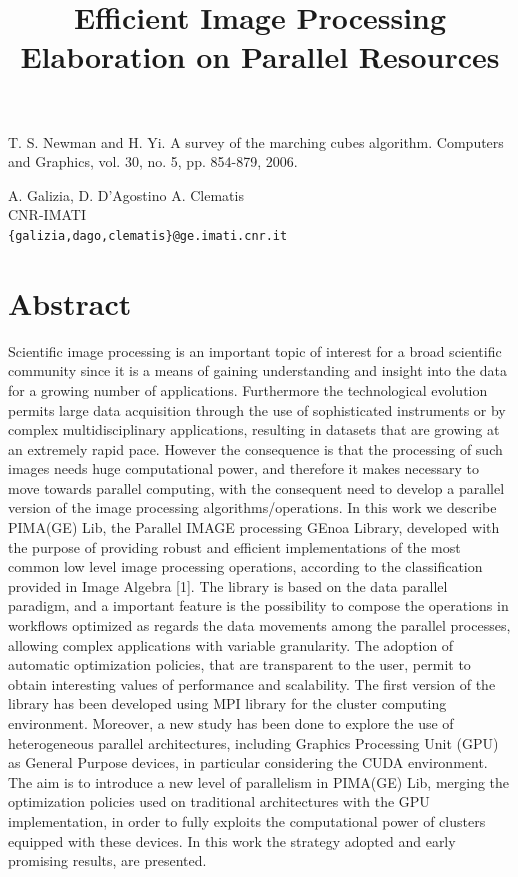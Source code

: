 \documentclass[article,A4,11pt]{llncs}%
\begin{document}

\begin{thebibliography}{10}
{\sc T. S. Newman and H. Yi}. {A survey of the marching cubes algorithm}. Computers and Graphics, vol. 30, no. 5, pp. 854-879, 2006.
\end{thebibliography}

\title{Efficient Image Processing Elaboration on Parallel Resources}
 \author{} \institute{}
\maketitle
\begin{center}
{\large A. Galizia, D. D'Agostino A. Clematis}\\
CNR-IMATI\\
{\tt \{galizia,dago,clematis\}@ge.imati.cnr.it}
\end{center}

\section*{Abstract}
Scientific image processing is an important topic of interest for a broad scientific community since it is a means of gaining understanding and insight into the data for a growing number of applications. Furthermore the technological evolution permits large data acquisition through the use of sophisticated instruments or by complex multidisciplinary applications, resulting in datasets that are growing at an extremely rapid pace. However the consequence is that the processing of such images needs huge computational power, and therefore it makes necessary to move towards parallel computing, with the consequent need to develop a parallel version of the image processing algorithms/operations. 
In this work we describe PIMA(GE) Lib, the Parallel IMAGE processing GEnoa Library, developed with the purpose of providing robust and efficient implementations of the most common low level image processing operations, according to the classification provided in Image Algebra [1]. The library is based on the data parallel paradigm, and a important feature is the possibility to compose the operations in workflows optimized as regards the data movements among the parallel processes, allowing complex applications with variable granularity. The adoption of automatic optimization policies, that are transparent to the user, permit to obtain interesting values of performance and scalability.  The first version of the library has been developed using MPI library for the cluster computing environment. 
Moreover, a new study has been done to explore the use of heterogeneous parallel architectures, including Graphics Processing Unit (GPU) as General Purpose devices, in particular considering the CUDA environment. The aim is to introduce a  new level of parallelism in PIMA(GE) Lib, merging the optimization policies used on traditional architectures with the GPU implementation, in order to fully exploits the computational power of clusters equipped with these devices.  In this work the strategy adopted and early promising results, are presented. 
\end{document}
